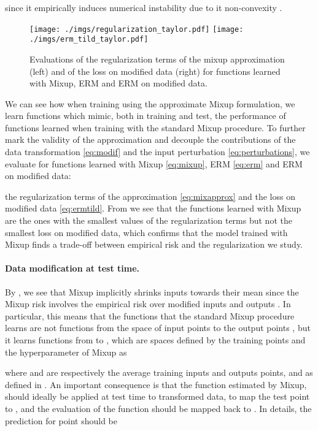 \documentclass[twoside,11pt]{article}
\begin{document}
since it empirically induces numerical instability due to it non-convexity \citep[see also][for a discussion about 
discarding the Hessian regularization]{wei2020implicit}. 
\begin{figure}[ht]
\centering
    \texttt{[image: ./imgs/regularization\_taylor.pdf]}
    \endminipage
\hspace{1cm}
    \texttt{[image: ./imgs/erm\_tild\_taylor.pdf]}
    \endminipage
\caption{\small{Evaluations of the regularization terms of the mixup approximation (left) and of the loss on modified data (right) for functions learned with Mixup, ERM and ERM on modified data.}}\label{fig:regularization_taylor}
\end{figure}
We can see how when training using the approximate Mixup formulation, 
we learn functions which mimic, both in training and test, 
the performance of functions learned when training with the standard Mixup procedure.
To further mark the validity of the approximation and decouple the contributions of 
the data transformation \eqref{eq:modif} and the input perturbation \eqref{eq:perturbations},
we evaluate for functions learned with Mixup \eqref{eq:mixup}, ERM \eqref{eq:erm} and ERM on modified data: 

the regularization terms of the approximation \eqref{eq:mixapprox} and the loss on modified data \eqref{eq:ermtild}.
From  we see that the functions learned with Mixup are the ones with the smallest values
of the regularization terms but not the smallest loss on modified data, which confirms that the model trained with Mixup finds a trade-off between empirical risk and the regularization we study.


\paragraph{Data modification at test time.} 
By , we see that Mixup implicitly shrinks inputs towards their 
mean since the Mixup risk involves the empirical risk over modified inputs  and outputs . 
In particular, this means that the functions that the standard Mixup procedure learns are not functions
from the space of input points  to the output points , but it learns functions from  to ,
which are spaces defined by the training points and the hyperparameter  of Mixup as  

where  and  are respectively the average training inputs and outputs points, 
and  as defined in .
An important consequence is that the function  estimated by Mixup, 
should ideally be applied at test time to transformed data, to 
map the test point  to , 
and the evaluation of the function  should be mapped back to .
In details, the prediction for point  should be
 
\end{document}

